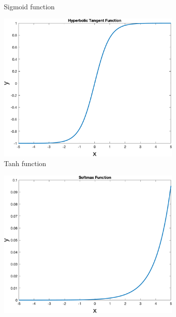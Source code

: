 \begin{figure}
\begin{subfigure}[b]{0.4\textwidth}
            \caption{Sigmoid function}
            \label{fig:sigmoid}
        \end{subfigure}
        \begin{subfigure}[b]{0.4\textwidth}
            \includegraphics[width=\textwidth]{figures/tanh}
            \caption{Tanh function}
            \label{fig:tahn}
        \end{subfigure}
        \hspace{0.1\textwidth}
        \begin{subfigure}[b]{0.4\textwidth}
            \includegraphics[width=\textwidth]{figures/softmax}

\end{subfigure}
\end{figure}
